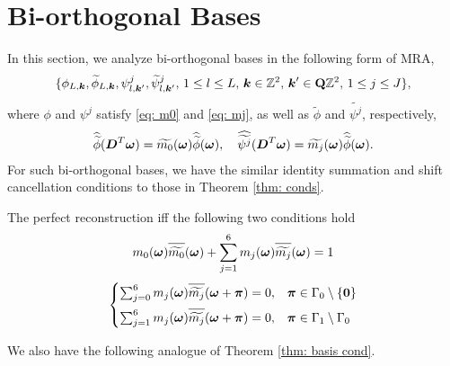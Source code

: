 \section{Bi-orthogonal Bases}\label{sec: bi-orth}
In this section, we analyze bi-orthogonal bases in the following form of MRA,
\begin{align}\label{eq: bi-orth MRA}
\{\phi_{L,\boldsymbol{k}},\widetilde{\phi}_{L,\boldsymbol{k}}, \psi_{l,\boldsymbol{k}'}^j,\widetilde{\psi}_{l,\boldsymbol{k}'}^j,\, 1\leq l\leq L,\,\boldsymbol{k}\in\mathbb{Z}^2,\, \boldsymbol{k}'\in\mathbf{Q}\mathbb{Z}^2,\,1\leq j\leq J \},
\end{align}
where $\phi$ and $\psi^j$ satisfy \eqref{eq: m0} and \eqref{eq: mj}, as well as $\widetilde{\phi}$ and $\widetilde{\psi^j}$, respectively,
\begin{align}\label{eq: mj_dual}
\widehat{\widetilde{\phi}}(\boldsymbol{D}^T\boldsymbol{\omega}) = \widetilde{m_0}(\boldsymbol{\omega})\widehat{\widetilde{\phi}}(\boldsymbol{\omega}),\quad \widehat{\widetilde{\psi^j}}(\boldsymbol{D}^T\boldsymbol{\omega}) = \widetilde{m_j}(\boldsymbol{\omega})\widehat{\widetilde{\phi}}(\boldsymbol{\omega}).
\end{align}
For such bi-orthogonal bases, we have the similar identity summation and shift cancellation conditions to those in Theorem \ref{thm: conds}.
\begin{thm}\label{thm: bi-orth conds}
The perfect reconstruction iff the following two conditions hold
\begin{align}\label{eq: id-sum 2}
m_0(\boldsymbol{\omega})\sbarm{0} + \sum_{j = 1}^6 m_j(\boldsymbol{\omega})\sbarm{j} = 1
\end{align}
\begin{equation}\label{eq: shift-cancel 2}
\begin{cases}
\sum_{j = 0}^6m_j(\boldsymbol{\omega})\overlinespace{\widetilde{m_j}}(\boldsymbol{\omega} + \boldsymbol{\pi}) = 0, & \boldsymbol{\pi}\in \Gamma_0\setminus\{\boldsymbol{0}\}\\[.5em]
\sum_{j=1}^6m_j(\boldsymbol{\omega})\overlinespace{\widetilde{m_j}}(\boldsymbol{\omega}+\boldsymbol{\pi}) = 0, & \boldsymbol{\pi}\in\Gamma_1\setminus\Gamma_0
\end{cases}
\end{equation}
\end{thm}
\vspace{1em}
We also have the following analogue of Theorem \ref{thm: basis cond}.
